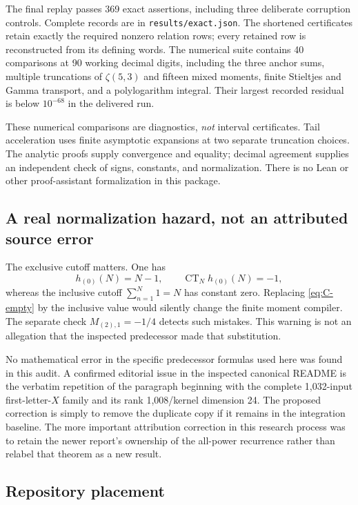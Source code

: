 \documentclass[11pt,letterpaper]{article}
\numberwithin{equation}{section}
\theoremstyle{definition}\newtheorem{definition}[theorem]{Definition}
\theoremstyle{remark}\newtheorem{remark}[theorem]{Remark}
\DeclareMathOperator{\CT}{CT}
\newcommand{\sref}[1]{\texttt{#1}}
\begin{document}
The final replay passes 369 exact assertions, including three deliberate
corruption controls. Complete records are in \sref{results/exact.json}.
The shortened certificates retain exactly the required nonzero relation
rows; every retained row is reconstructed from its defining words.
The numerical suite contains 40 comparisons at 90 working
decimal digits, including the three anchor sums, multiple truncations
of $\zeta(5,3)$ and fifteen mixed moments, finite Stieltjes and Gamma
transport, and a polylogarithm integral. Their largest recorded
residual is below $10^{-68}$ in the delivered run.

These numerical comparisons are diagnostics, \emph{not} interval
certificates. Tail acceleration uses finite asymptotic expansions
at two separate truncation choices. The analytic proofs supply
convergence and equality; decimal agreement supplies an independent
check of signs, constants, and normalization. There is no Lean or
other proof-assistant formalization in this package.

\subsection{A real normalization hazard, not an attributed source error}

The exclusive cutoff matters. One has
\[
 h_{(0)}(N)=N-1,\qquad \CT_N h_{(0)}(N)=-1,
\]
whereas the inclusive cutoff $\sum_{n=1}^{N}1=N$ has constant zero.
Replacing \eqref{eq:C-empty} by the inclusive value would silently
change the finite moment compiler. The separate check
$M_{(2),1}=-1/4$ detects such mistakes. This warning is not an
allegation that the inspected predecessor made that substitution.

No mathematical error in the specific predecessor formulas used
here was found in this audit. A confirmed editorial issue in the
inspected canonical README is the verbatim repetition of the paragraph
beginning with the complete 1,032-input first-letter-$X$ family and
its rank 1,008/kernel dimension 24. The proposed correction is simply
to remove the duplicate copy if it remains in the integration baseline.
The more important attribution correction in this research process
was to retain the newer report's ownership of the all-power recurrence
rather than relabel that theorem as a new result.

\subsection{Repository placement}
\end{document}
